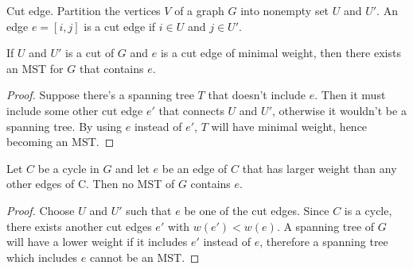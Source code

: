 \begin{definition}{Cut edge.}
  Partition the vertices $V$ of a graph $G$ into nonempty set $U$ and $U'$.  An
  edge $e=[i,j]$ is a cut edge if $i\in U$ and $j\in U'$.
\end{definition}
\begin{lemma}
  If $U$ and $U'$ is a cut of $G$ and $e$ is a cut edge of minimal weight, then
  there exists an MST for $G$ that contains $e$.
\end{lemma}
\begin{proof}
  Suppose there's a spanning tree $T$ that doesn't include $e$.  Then it must
  include some other cut edge $e'$ that connects $U$ and $U'$, otherwise it
  wouldn't be a spanning tree.  By using $e$ instead of $e'$, $T$ will have
  minimal weight, hence becoming an MST.
\end{proof}
\begin{lemma}
  Let $C$ be a cycle in $G$ and let $e$ be an edge of $C$ that has larger
  weight than any other edges of C.  Then no MST of $G$ contains $e$.
\end{lemma}
\begin{proof}
  Choose $U$ and $U'$ such that $e$ be one of the cut edges.  Since $C$ is
  a cycle, there exists another cut edges $e'$ with $w(e')<w(e)$.
  A spanning tree of $G$ will have a lower weight if it includes $e'$ instead
  of $e$, therefore a spanning tree which includes $e$ cannot be an MST.
\end{proof}






